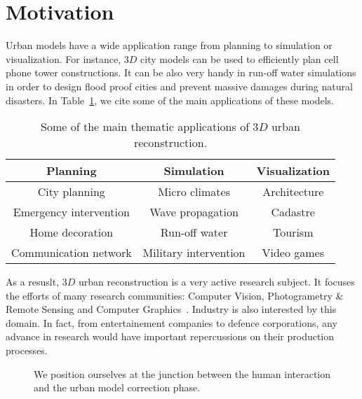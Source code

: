 \documentclass[../main.tex]{subfiles}
\begin{document}
    \section{Motivation}

    Urban models have a wide application range from planning to simulation or visualization. For instance, $3D$ city models can be used to efficiently plan cell phone tower constructions. It can be also very handy in run-off water simulations in order to design flood proof cities and prevent massive damages during natural disasters. In Table~\ref{tab::3d_applications}, we cite some of the main applications of these models.\\

    \begin{table}[H]
        \begin{center}
            \begin{tabular}{c c c}
                \toprule
                Planning & Simulation & Visualization \\
                \midrule
                City planning & Micro climates & Architecture \\
                Emergency intervention & Wave propagation & Cadastre \\
                Home decoration & Run-off water & Tourism \\
                Communication network & Military intervention & Video games \\
                \bottomrule
            \end{tabular}
            \caption{\label{tab::3d_applications} Some of the main thematic applications of $3D$ urban reconstruction\cite{Scholze2002}.}
        \end{center}
    \end{table}

    As a resuslt, $3D$ urban reconstruction is a very active research subject. It focuses the efforts of many research communities: Computer Vision, Photogrametry \& Remote Sensing and Computer Graphics~\cite{Musialski2012}. Industry is also interested by this domain. In fact, from entertainement companies to defence corporations, any advance in research would have  important repercussions on their production processes.\\

    \begin{figure}[H]
        \begin{center}
            
            \caption{\label{fig::situation} We position ourselves at the junction between the human interaction and the urban model correction phase.}
        \end{center}
    \end{figure}
\end{document}
